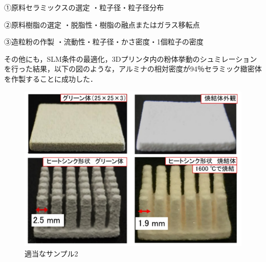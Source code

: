 ①原料セラミックスの選定
・粒子径・粒子径分布

②原料樹脂の選定
・脱脂性・樹脂の融点またはガラス移転点

③造粒粉の作製
・流動性・粒子径・かさ密度・1個粒子の密度

その他にも，SLM条件の最適化，3Dプリンタ内の粉体挙動のシュミレーションを行った結果，以下の図のような，アルミナの相対密度が94％セラミック緻密体を作製することに成功した．

\begin{figure}[H]
  \centering
  \includegraphics[width=11truecm]{./fig/セラミック.jpg}
  \caption{適当なサンプル2}
  \label{fig:ferret}
\end{figure}




